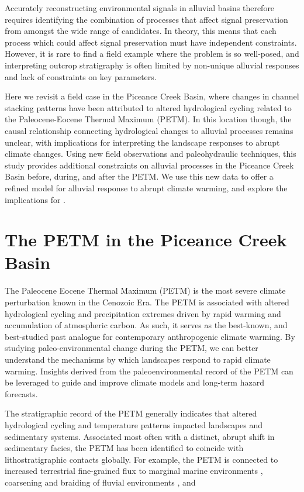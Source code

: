 \documentclass[draft]{compact_proposal}
\begin{document}
Accurately reconstructing environmental signals in alluvial basins therefore requires identifying the combination of processes that affect signal preservation from amongst the wide range of candidates.
In theory, this means that each process which could affect signal preservation must have independent constraints.
However, it is rare to find a field example where the problem is so well-posed, and interpreting outcrop stratigraphy is often limited by non-unique alluvial responses and lack of constraints on key parameters.

Here we revisit a field case in the Piceance Creek Basin, where changes in channel stacking patterns have been attributed to altered hydrological cycling related to the Paleocene-Eocene Thermal Maximum (PETM).
In this location though, the causal relationship connecting hydrological changes to alluvial processes remains unclear, with implications for interpreting the landscape responses to abrupt climate changes.
Using new field observations and paleohydraulic techniques, this study provides additional constraints on alluvial processes in the Piceance Creek Basin before, during, and after the PETM.
We use this new data to offer a refined model for alluvial response to abrupt climate warming, and explore the implications for \pnote[something]. 

\section{The PETM in the Piceance Creek Basin}

The Paleocene Eocene Thermal Maximum (PETM) is the most severe climate perturbation known in the Cenozoic Era.
The PETM is associated with altered hydrological cycling and precipitation extremes driven by rapid warming and accumulation of atmospheric carbon.
As such, it serves as the best-known, and best-studied past analogue for contemporary anthropogenic climate warming.
By studying paleo-environmental change during the PETM, we can better understand the mechanisms by which landscapes respond to rapid climate warming.
Insights derived from the paleoenvironmental record of the PETM can be leveraged to guide and improve climate models and long-term hazard forecasts.

The stratigraphic record of the PETM generally indicates that altered hydrological cycling and temperature patterns impacted landscapes and sedimentary systems.
Associated most often with a distinct, abrupt shift in sedimentary facies, the PETM has been identified to coincide with lithostratigraphic contacts globally.
For example, the PETM is connected to increased terrestrial fine-grained flux to marginal marine environments \cnote[miller], coarsening and braiding of fluvial environments \cnote[pujalte], and 
\end{document}
